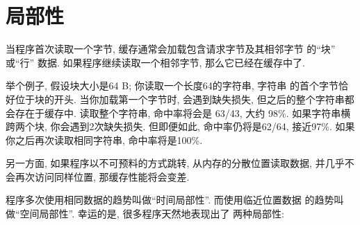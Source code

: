 \documentclass[12pt]{book}
\begin{document}
{%
\section{局部性}


当程序首次读取一个字节, 缓存通常会加载包含请求字节及其相邻字节
的``块'' 或``行'' 数据. 如果程序继续读取一个相邻字节, 那么它已经在缓存中了.

举个例子, 假设块大小是64 B; 你读取一个长度64的字符串, 字符串
的首个字节恰好位于块的开头. 当你加载第一个字节时, 会遇到缺失损失, 
但之后的整个字符串都会存在于缓存中. 读取整个字符串, 命中率将会是
63/43, 大约 98\%. 如果字符串横跨两个块, 你会遇到2次缺失损失. 
但即便如此, 命中率仍将是62/64, 接近97\%. 如果你之后再次读取相同字符串,
命中率将是100\%. 

另一方面, 如果程序以不可预料的方式跳转, 从内存的分散位置读取数据,
并几乎不会再次访问同样位置, 那缓存性能将会变差.

程序多次使用相同数据的趋势叫做``时间局部性''. 而使用临近位置数据
的趋势叫做``空间局部性''. 幸运的是, 很多程序天然地表现出了
两种局部性:

\begin{itemize}


\end{itemize}}
\end{document}
